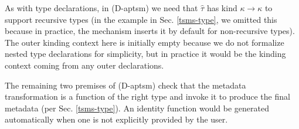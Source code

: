 \documentclass{sig-alternate}
\begin{document}
As with type declarations, in (D-aptsm) we need that $\hat{\tau}$ has kind $\kappa \rightarrow \kappa$ to support recursive types (in the example in Sec. \ref{tsms-type}, we omitted this because in practice, the mechanism inserts it by default for non-recursive types). The outer kinding context here is initially empty because we do not formalize nested type declarations for simplicity, but in practice it would be the kinding context coming from any outer declarations. 

The remaining two premises of (D-aptsm) check that the metadata transformation is a function of the right type and invoke it to produce the final metadata (per Sec. \ref{tsms-type}). An identity function would be generated automatically when one is not explicitly provided by the user.






\end{document}
